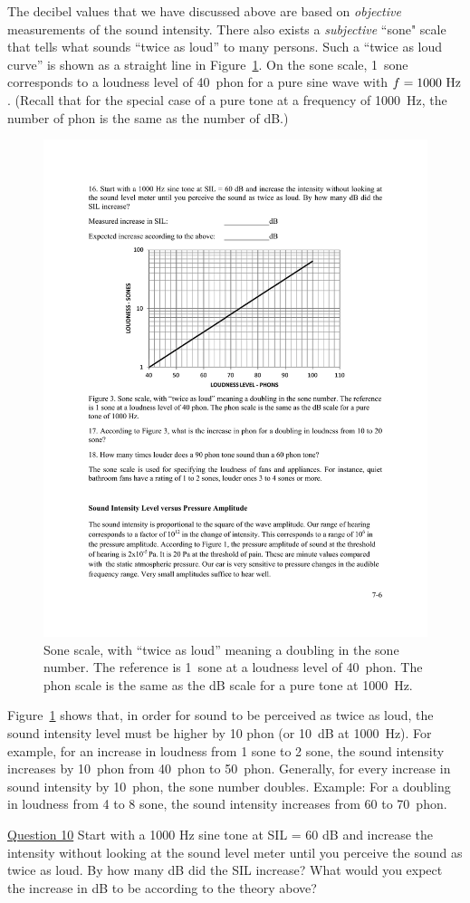 \documentclass[11pt]{NSF}
\begin{document}
The decibel values that we have discussed above are based on 
{\em objective} measurements of the sound intensity. 
There also exists a {\em subjective} ``sone" scale that tells 
what sounds ``twice as loud” to many persons. 
Such a ``twice as loud curve” is shown as a straight line in 
Figure~\ref{f:3}. 
On the sone scale, 1~sone corresponds to a loudness level of 
40~phon for a pure sine wave with $f = 1000~{\rm Hz}$. 
(Recall that for the special case of a pure tone at a frequency 
of 1000~Hz, the number of phon is the same 
as the number of dB.)
%
\begin{figure}[hbtp]
\begin{center}
\includegraphics[width=.6\textwidth]{fig7_3}
\caption{Sone scale, with ``twice as loud” meaning a doubling in the
sone number. The reference is 1~sone at a loudness level of 40~phon.
The phon scale is the same as the dB scale for a pure tone at 1000~Hz.}
\label{f:3}
\end{center}
\end{figure}

Figure~\ref{f:3} shows that, in order for sound to be perceived as twice as
loud, the sound intensity level must be higher by 10 phon (or 10~dB at
1000~Hz).
For example, for an increase in loudness from 1 sone to 2 sone, the 
sound intensity increases by 10~phon from 40~phon to 50~phon. 
Generally, for every increase in sound intensity by 10~phon, the sone 
number doubles. 
Example: For a doubling in loudness from 4 to 8 sone, the sound intensity 
increases from 60 to 70~phon.

\underline{Question 10} Start with a 1000 Hz sine tone at SIL = 60 dB and increase the intensity without looking at
the sound level meter until you perceive the sound as twice as loud. By how many dB did the
SIL increase? What would you expect the increase in dB to be according to the theory above?
\end{document}
